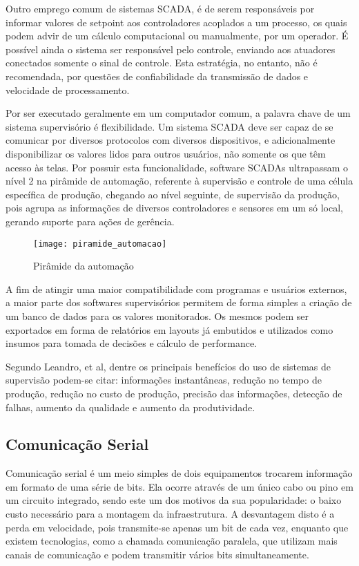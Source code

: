 Outro emprego comum de sistemas SCADA, é de serem responsáveis por informar valores de setpoint aos controladores acoplados a um processo, os quais podem advir de um cálculo computacional ou manualmente, por um operador. É possível ainda o sistema ser responsável pelo controle, enviando aos atuadores conectados somente o sinal de controle. Esta estratégia, no entanto, não é recomendada, por questões de confiabilidade da transmissão de dados e velocidade de processamento.

Por ser executado geralmente em um computador comum, a palavra chave de um sistema supervisório é flexibilidade. Um sistema SCADA deve ser capaz de se comunicar por diversos protocolos com diversos dispositivos, e adicionalmente disponibilizar os valores lidos para outros usuários, não somente os que têm acesso às telas. Por possuir esta funcionalidade, software SCADAs ultrapassam o nível 2 na pirâmide de automação, referente à supervisão e controle de uma célula específica de produção, chegando ao nível seguinte, de supervisão da produção, pois agrupa as informações de diversos controladores e sensores em um só local, gerando suporte para ações de gerência.

\begin{figure}
	\centering
	\texttt{[image: piramide\_automacao]}
	\caption{Pirâmide da automação}
	\label{img_piramide_automacao}
\end{figure}

A fim de atingir uma maior compatibilidade com programas e usuários externos, a maior parte dos softwares supervisórios permitem de forma simples a criação de um banco de dados para os valores monitorados. Os mesmos podem ser exportados em forma de relatórios em layouts já embutidos e utilizados como insumos para tomada de decisões e cálculo de performance.

Segundo Leandro, et al, dentre os principais benefícios do uso de sistemas de supervisão podem-se citar: informações instantâneas, redução no tempo de produção, redução no custo de produção, precisão das informações, detecção de falhas, aumento da qualidade e aumento da produtividade.

\subsection{Comunicação Serial}

Comunicação serial é um meio simples de dois equipamentos trocarem informação em formato de uma série de bits. Ela ocorre através de um único cabo ou pino em um circuito integrado, sendo este um dos motivos da sua popularidade: o baixo custo necessário para a montagem da infraestrutura. A desvantagem disto é a perda em velocidade, pois transmite-se apenas um bit de cada vez, enquanto que existem tecnologias, como a chamada comunicação paralela, que utilizam mais canais de comunicação e podem transmitir vários bits simultaneamente.

